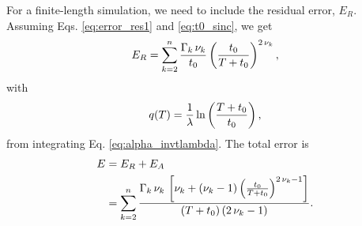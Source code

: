 \documentclass[preprint, floatfix]{revtex4-1}
\newcommand{\note}[1]{{\color{DarkGreen}\footnotesize \textsc{Note.} #1}}
\newcommand{\Err}{E}
\begin{document}
For a finite-length simulation,
we need to include the residual error, $\Err_R$.
%
Assuming Eqs. \eqref{eq:error_res1} and \eqref{eq:t0_sinc},
we get
%
\begin{equation}
\Err_R
=
\sum_{k = 2}^n
  \frac{ \Gamma_k \, \nu_k }
       {        t_0   }
  \left(
      \frac{   t_0   }
           { T + t_0 }
   \right)^{ 2 \, \nu_k },
\notag
\end{equation}
%
with
%
\begin{equation}
  q(T)
  =
  \frac{ 1 } { \lambda }
  \ln\left(
    \frac{ T + t_0 } { t_0 }
  \right)
  ,
\notag
\end{equation}
%
from integrating Eq. \eqref{eq:alpha_invtlambda}.
%
%
The total error is
%
\begin{align}
\Err
&=
\Err_R + \Err_A
\notag
\\
&=
\sum_{ k = 2 }^n
  \frac
  {
    \Gamma_k \, \nu_k \,
    \left[
      \nu_k
      +
      (\nu_k - 1)
      \left(
        \frac{ t_0 } { T + t_0 }
      \right)^{ 2 \, \nu_k - 1 }
    \right]
  }
  {
    (T + t_0) \, (2 \, \nu_k - 1)
  }
  .
\label{eq:error_invt}
\end{align}
%

\end{document}
